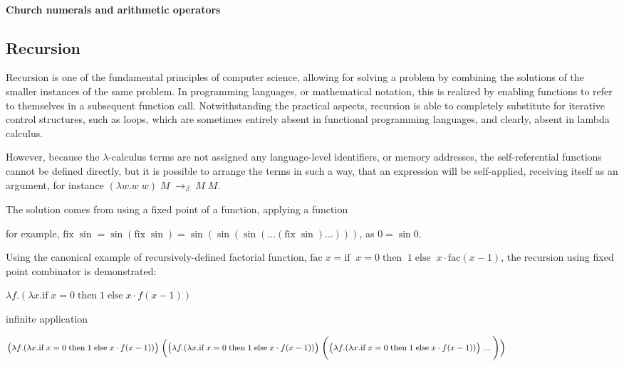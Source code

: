 \documentclass[table, a4paper, 10pt]{book}
\begin{document}
\paragraph{Church numerals and arithmetic operators} \label{ChurchNumerals}

\subsection{Recursion}
Recursion is one of the fundamental principles of computer science,
allowing for solving a problem by combining the solutions
of the smaller instances of the same problem. In programming languages,
or mathematical notation, this is realized by enabling functions
to refer to themselves in a subsequent function call. Notwithstanding
the practical aspects, recursion is able to completely substitute
for iterative control structures, such as loops,
which are sometimes entirely absent in functional programming languages, and clearly,
absent in lambda calculus.

However, because the $\lambda$-calculus terms are not assigned any language-level identifiers, or memory addresses,
the self-referential functions cannot be defined directly, but it is possible to
arrange the terms in such a way, that an expression will be self-applied, receiving
itself as an argument, for instance $(\lambda w.w\;w)\;M\;\to_\beta\;M\;M$.

The solution comes from using a fixed point of a function, applying a function

for example, $\mathrm{fix}\;\sin = \sin(\mathrm{fix}\;\sin) = \sin(\sin(\sin(...(\mathrm{fix}\;\sin)...)))$, as $0 = \sin 0$.

Using the canonical example of recursively-defined factorial function,
\mbox{$\mathrm{fac}\;x = \text{if}\;\;x = 0\;\text{then}\;\;1\;\text{else}\;\;x \cdot \mathrm{fac}(x-1)$,}
the recursion using fixed point combinator is demonstrated:

$\lambda f.(\lambda x. \text{if}\;x = 0\;\text{then}\;1\;\text{else}\;x\cdot f(x - 1))$

infinite application

$\text{\footnotesize$
\big(\lambda f.(\lambda x. \text{if}\;x = 0\;\text{then}\;1\;\text{else}\;x\cdot f(x - 1))\big)
\;\Big(\big(\lambda f.(\lambda x. \text{if}\;x = 0\;\text{then}\;1\;\text{else}\;x\cdot f(x - 1))\big)
\;\Bigg(\big(\lambda f.(\lambda x. \text{if}\;x = 0\;\text{then}\;1\;\text{else}\;x\cdot f(x - 1))\big)
\;...\;\Bigg)\Big)
$}$
\end{document}
